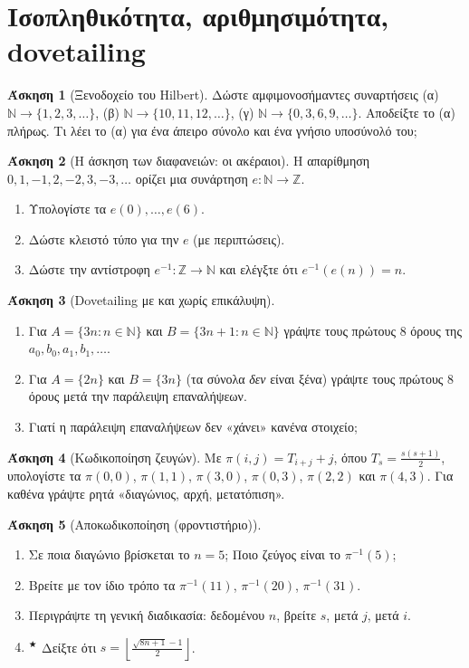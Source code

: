 \documentclass[11pt,a4paper]{article}
\theoremstyle{definition}
\newtheorem{question}{Άσκηση}
\newcommand{\N}{\mathbb{N}}
\newcommand{\Z}{\mathbb{Z}}
\newcommand{\st}{$^{\bigstar}$}  %
\newcommand{\gi}[1]{\item[(#1)]}
\begin{document}
\section{Ισοπληθικότητα, αριθμησιμότητα, dovetailing}

\begin{question}[Ξενοδοχείο του Hilbert]
Δώστε αμφιμονοσήμαντες συναρτήσεις
(α) $\N\to\{1,2,3,\dots\}$,\;
(β) $\N\to\{10,11,12,\dots\}$,\;
(γ) $\N\to\{0,3,6,9,\dots\}$.
Αποδείξτε το (α) πλήρως. Τι λέει το (α) για ένα άπειρο σύνολο και ένα γνήσιο υποσύνολό του;
\end{question}


\begin{question}[Η άσκηση των διαφανειών: οι ακέραιοι]\leavevmode\par
Η απαρίθμηση $0,1,-1,2,-2,3,-3,\dots$ ορίζει μια συνάρτηση
$e:\N\to\Z$.
\begin{enumerate}[itemsep=0pt]
\gi{α} Υπολογίστε τα $e(0),\dots,e(6)$.
\gi{β} Δώστε κλειστό τύπο για την $e$ (με περιπτώσεις).
\gi{γ} Δώστε την αντίστροφη $e^{-1}:\Z\to\N$ και ελέγξτε ότι $e^{-1}(e(n))=n$.
\end{enumerate}
\end{question}


\begin{question}[Dovetailing με και χωρίς επικάλυψη]
\begin{enumerate}[itemsep=0pt]
\gi{α} Για $A=\{3n:n\in\N\}$ και $B=\{3n+1:n\in\N\}$ γράψτε τους πρώτους 8 όρους της
$a_0,b_0,a_1,b_1,\dots$.
\gi{β} Για $A=\{2n\}$ και $B=\{3n\}$ (τα σύνολα \emph{δεν} είναι ξένα) γράψτε τους πρώτους 8
όρους μετά την παράλειψη επαναλήψεων.
\gi{γ} Γιατί η παράλειψη επαναλήψεων δεν «χάνει» κανένα στοιχείο;
\end{enumerate}
\end{question}


\begin{question}[Κωδικοποίηση ζευγών]
Με $\pi(i,j)=T_{i+j}+j$, όπου $T_s=\frac{s(s+1)}{2}$, υπολογίστε τα
$\pi(0,0)$, $\pi(1,1)$, $\pi(3,0)$, $\pi(0,3)$, $\pi(2,2)$ και $\pi(4,3)$.
Για καθένα γράψτε ρητά «διαγώνιος, αρχή, μετατόπιση».
\end{question}


\begin{question}[Αποκωδικοποίηση (φροντιστήριο)]
\begin{enumerate}[itemsep=0pt]
\gi{α} Σε ποια διαγώνιο βρίσκεται το $n=5$; Ποιο ζεύγος είναι το $\pi^{-1}(5)$;
\gi{β} Βρείτε με τον ίδιο τρόπο τα $\pi^{-1}(11)$, $\pi^{-1}(20)$, $\pi^{-1}(31)$.
\gi{γ} Περιγράψτε τη γενική διαδικασία: δεδομένου $n$, βρείτε $s$, μετά $j$, μετά $i$.
\gi{δ} \st{} Δείξτε ότι $s=\left\lfloor \frac{\sqrt{8n+1}-1}{2}\right\rfloor$.
\end{enumerate}
\end{question}
\end{document}
